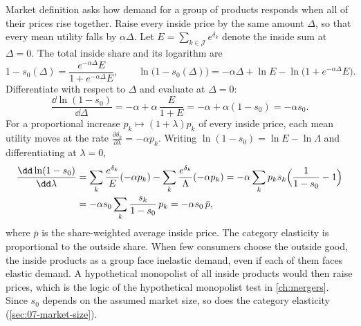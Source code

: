 Market definition asks how demand for a group of products responds when all of their prices rise together.
Raise every inside price by the same amount $\Delta$, so that every mean utility falls by $\alpha\Delta$. Let
$E = \sum_{k \in \mathcal{J}} e^{\delta_k}$ denote the inside sum at $\Delta = 0$. The total inside share and
its logarithm are
\begin{equation*}
  1 - s_0(\Delta) = \frac{e^{-\alpha\Delta}E}{1 + e^{-\alpha\Delta}E}, \qquad
  \ln\big(1 - s_0(\Delta)\big) = -\alpha\Delta + \ln E - \ln\big(1 + e^{-\alpha\Delta}E\big).
\end{equation*}
Differentiate with respect to $\Delta$ and evaluate at $\Delta = 0$:
\begin{equation}\label{eq:07-category-semi}
  \frac{\dd\ln(1 - s_0)}{\dd\Delta}
  = -\alpha + \alpha\,\frac{E}{1 + E}
  = -\alpha + \alpha(1 - s_0)
  = -\alpha s_0 .
\end{equation}
For a proportional increase $p_k \mapsto (1 + \lambda)p_k$ of every inside price, each mean utility moves at the
rate $\frac{\partial \delta_k}{\partial \lambda} = -\alpha p_k$. Writing $\ln(1 - s_0) = \ln E - \ln\Lambda$
and differentiating at $\lambda = 0$,
\begin{align}
  \frac{\dd\ln(1 - s_0)}{\dd\lambda}
  &= \sum_{k}\frac{e^{\delta_k}}{E}(-\alpha p_k) - \sum_{k}\frac{e^{\delta_k}}{\Lambda}(-\alpha p_k)
   = -\alpha\sum_k p_k s_k\Big(\frac{1}{1 - s_0} - 1\Big) \notag\\
  &= -\alpha s_0\sum_k \frac{s_k}{1 - s_0}\,p_k
   = -\alpha s_0\,\bar p, \label{eq:07-category-elast}
\end{align}
where $\bar p$ is the share-weighted average inside price. The category elasticity is proportional to the
outside share. When few consumers choose the outside good, the inside products as a group face inelastic
demand, even if each of them faces elastic demand. A hypothetical monopolist of all inside products would then
raise prices, which is the logic of the hypothetical monopolist test in \cref{ch:mergers}. Since $s_0$
depends on the assumed market size, so does the category elasticity (\cref{sec:07-market-size}).


